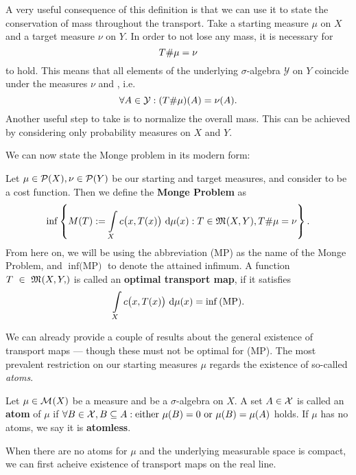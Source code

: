 A very useful consequence of this definition is that we can use it to state the conservation of mass throughout the transport. Take a starting measure $\mu$ on $X$ and a target measure $\nu$ on $Y$. In order to not lose any mass, it is necessary for
\[ {T} \# \mu = \nu \]
to hold. This means that all elements of the underlying $\sigma$-algebra $\mathcal{Y}$ on $Y$ coincide under the measures $\nu$ and \push{\mu}, i.e.
\[ \forall A \in \mathcal{Y}: ({T} \# \mu)(A) = \nu(A).\]
Another useful step to take is to normalize the overall mass. This can be achieved by considering only probability measures on $X$ and $Y$.

We can now state the Monge problem in its modern form:

\begin{definition}\label{MongeProb}
	Let $\mu \in \mathcal{P}(X), \nu \in \mathcal{P}(Y)$ be our starting and target measures, and consider  to be a cost function. Then we define the \textbf{Monge Problem} as
	\[ \inf \left\{ M(T) := \int\limits_X c\big( x, T(x) \big)~\text{\normalfont{}d}{\mu}({x}) : T \in \mathfrak{M}_{}(X, Y), {T} \# \mu = \nu \right\}. \]
	From here on, we will be using the abbreviation (MP) as the name of the Monge Problem, and $\inf \text{(MP)}$ to denote the attained infimum. A function $T~\in~\MF{X, Y}$ is called an \textbf{optimal transport map}, if it satisfies
	\[ \int\limits_X c\big( x, T(x) \big)~\text{\normalfont{}d}{\mu}({x}) = \inf \text{(MP)}. \]
\end{definition}

We can already provide a couple of results about the general existence of transport maps --- though these must not be optimal for (MP). The most prevalent restriction on our starting measures $\mu$ regards the existence of so-called \textit{atoms}.

\begin{definition}\label{Atoms}
	Let $\mu \in \mathcal{M}_{}(X)$ be a measure and \X{} be a $\sigma$-algebra on $X$. A set $A \in \mathcal{X}$ is called an \textbf{atom} of $\mu$ if $\forall B \in \mathcal{X}, B \subseteq A: \text{either } \mu(B) = 0 \text{ or } \mu(B) = \mu(A)$ holds. If $\mu$ has no atoms, we say it is \textbf{atomless}.
\end{definition}

When there are no atoms for $\mu$ and the underlying measurable space is compact, we can first acheive existence of transport maps on the real line.

